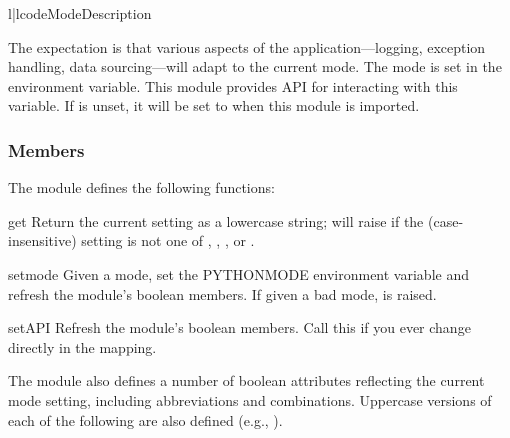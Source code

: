 \begin{tableii}{l|l}{code}{Mode}{Description}
\end{tableii}


The expectation is that various aspects of the application---logging, exception
handling, data sourcing---will adapt to the current mode. The mode is set in the
 environment variable. This module provides API for
interacting with this variable. If  is unset, it will be set
to  when this module is imported.

\subsubsection{Members}

The module defines the following functions:

\begin{funcdesc}{get}{}
Return the current  setting as a lowercase string; will raise
 if the (case-insensitive) setting is not one of
, , , or .
\end{funcdesc}

\begin{funcdesc}{set}{mode}
Given a mode, set the PYTHONMODE environment variable and refresh the module's
boolean members. If given a bad mode,  is raised.
\end{funcdesc}

\begin{funcdesc}{setAPI}{}
Refresh the module's boolean members. Call this if you ever change
 directly in the  mapping.
\end{funcdesc}

The module also defines a number of boolean attributes reflecting the current
mode setting, including abbreviations and combinations. Uppercase versions of
each of the following are also defined (e.g., ).

